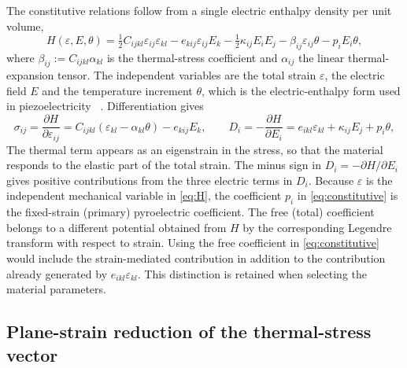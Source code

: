 \documentclass[a4paper,12pt]{elsarticle}
\begin{document}
The constitutive relations follow from a single electric enthalpy density per unit
volume,
\begin{equation}
H(\varepsilon,E,\theta)=\tfrac12 C_{ijkl}\varepsilon_{ij}\varepsilon_{kl}
-e_{kij}\varepsilon_{ij}E_k-\tfrac12\kappa_{ij}E_iE_j-\beta_{ij}\varepsilon_{ij}\theta
-p_iE_i\theta,
\label{eq:H}
\end{equation}
where $\beta_{ij}:=C_{ijkl}\alpha_{kl}$ is the thermal-stress coefficient and
$\alpha_{ij}$ the linear thermal-expansion tensor. The independent variables are the
total strain $\varepsilon$, the electric field $E$ and the temperature increment
$\theta$, which is the electric-enthalpy form used in piezoelectricity
~\cite{Tiersten1969b,Yang2005b}. Differentiation gives
\begin{equation}
\sigma_{ij}=\frac{\partial H}{\partial\varepsilon_{ij}}
=C_{ijkl}(\varepsilon_{kl}-\alpha_{kl}\theta)-e_{kij}E_k,
\qquad
D_i=-\frac{\partial H}{\partial E_i}
=e_{ikl}\varepsilon_{kl}+\kappa_{ij}E_j+p_i\theta,
\label{eq:constitutive}
\end{equation}
The thermal term appears as an eigenstrain in the stress, so that the material responds
to the elastic part of the total strain. The minus sign in
$D_i=-\partial H/\partial E_i$ gives positive contributions from the three electric
terms in $D_i$. Because $\varepsilon$ is the independent mechanical variable in
\eqref{eq:H}, the coefficient $p_i$ in \eqref{eq:constitutive} is the fixed-strain
(primary) pyroelectric coefficient. The free (total) coefficient belongs to a different
potential obtained from $H$ by the corresponding Legendre transform with respect to
strain. Using the free coefficient in \eqref{eq:constitutive} would include the
strain-mediated contribution in addition to the contribution already generated by
$e_{ikl}\varepsilon_{kl}$. This distinction is retained when selecting the material parameters.

\subsection{Plane-strain reduction of the thermal-stress vector}
\label{sec:planestrain}
\end{document}
